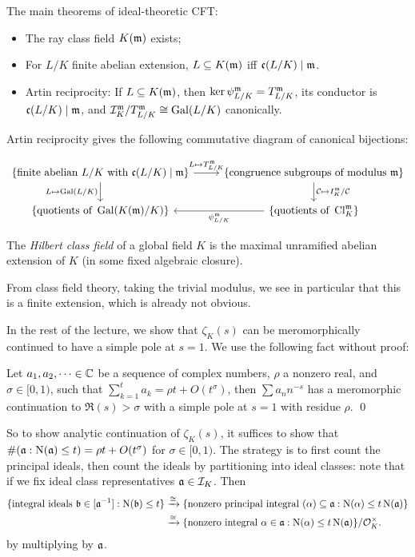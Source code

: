\documentclass[11pt]{amsart}
\begin{document}
\begin{thm}
\label{idealCFT}
    The main theorems of ideal-theoretic CFT:
    \begin{itemize}
        \item The ray class field $K(\mathfrak{m})$ exists;
        \item For $L/K$ finite abelian extension, $L\subseteq K(\mathfrak{m})$ iff $\mathfrak{c}(L/K)\mid\mathfrak{m}$.
        \item Artin reciprocity: If $L\subseteq K(\mathfrak{m})$, then $\ker\psi_{L/K}^{\mathfrak{m}} = T_{L/K}^{\mathfrak{m}}$, its conductor is $\mathfrak{c}(L/K)\mid\mathfrak{m}$, and $\mathcal{I}_K^{\mathfrak{m}}/T_{L/K}^{\mathfrak{m}} \cong \operatorname{Gal}(L/K)$ canonically.
    \end{itemize}
\end{thm}

Artin reciprocity gives the following commutative diagram of canonical bijections:

\[
\begin{tikzcd}
    \{\text{finite abelian } L/K \text{ with } \fc(L/K)\mid \fm\} \arrow[r, "{L\mapsto T_{L/K}^\fm}"] \arrow[d, "{L\mapsto \Gal(L/K)}"'] & \{\text{congruence subgroups of modulus } \fm\} \arrow[d, "{\cC\mapsto I_K^\fm/\cC}"] \\
    \{\text{quotients of } \Gal(K(\fm)/K)\} & \{\text{quotients of } \Cl_K^\fm\} \arrow[l, "{\psi_{L/K}^\fm}"]
\end{tikzcd}
\]

\begin{defn}
    The \emph{Hilbert class field} of a global field $K$ is the maximal unramified abelian extension of $K$ (in some fixed algebraic closure).
\end{defn}

From class field theory, taking the trivial modulus, we see in particular that this is a finite extension, which is already not obvious.

In the rest of the lecture, we show that $\zeta_K(s)$ can be meromorphically continued to have a simple pole at $s = 1$. We use the following fact without proof:


\begin{prop}
    Let $a_1,a_2,\dots\in \mathbb{C}$ be a sequence of complex numbers, $\rho$ a nonzero real, and $\sigma\in [0,1)$, such that $\sum_{k=1}^t a_k = \rho t + O(t^\sigma)$, then $\sum a_nn^{-s}$ has a meromorphic continuation to $\Re(s) > \sigma$ with a simple pole at $s=1$ with residue $\rho$. \qed
\end{prop}

So to show analytic continuation of $\zeta_K(s)$, it suffices to show that $\#(\mathfrak{a}: \operatorname{N}(\mathfrak{a})\le t) = \rho t + O(t^\sigma)$ for $\sigma\in [0,1)$. The strategy is to first count the principal ideals, then count the ideals by partitioning into ideal classes: note that if we fix ideal class representatives $\mathfrak{a}\in \mathcal{I}_K$. Then
\begin{align*}
\{\text{integral ideals } \mathfrak{b}\in [\mathfrak{a}^{-1}]: \operatorname{N}(\mathfrak{b}) \le t\} &\xrightarrow{\cong} \{\text{nonzero principal integral } (\alpha)\subseteq \mathfrak{a}: \operatorname{N}(\alpha)\le t\operatorname{N}(\mathfrak{a})\} \\
&\xrightarrow{\cong} \{\text{nonzero integral } \alpha\in \mathfrak{a}: \operatorname{N}(\alpha)\le t\operatorname{N}(\mathfrak{a})\}/\mathcal{O}_K^\times.
\end{align*}
by multiplying by $\mathfrak{a}$.
\end{document}
